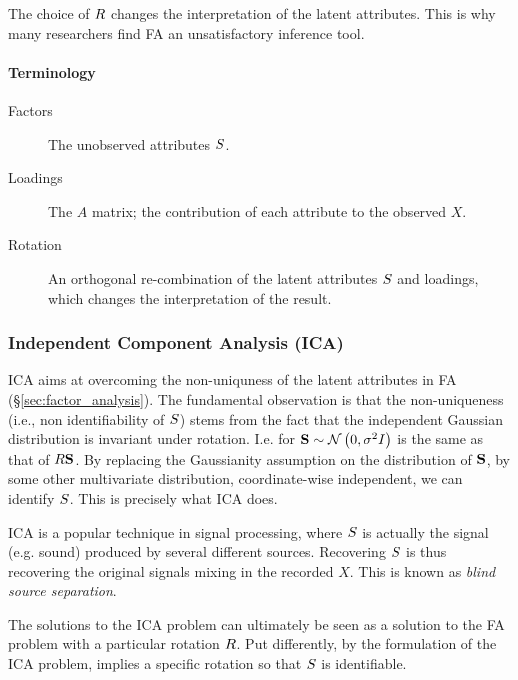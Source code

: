 The choice of $R$ changes the interpretation of the latent attributes. This is why many researchers find FA an unsatisfactory inference tool.



\paragraph{Terminology}
\begin{description}
\item[Factors] The unobserved attributes $S$.
\item[Loadings] The $A$ matrix; the contribution of each attribute to the observed $X$.
\item[Rotation] An orthogonal re-combination of the latent attributes $S$ and loadings, which changes the interpretation of the result.
\end{description}




\subsubsection{Independent Component Analysis (ICA)}
ICA aims at overcoming the non-uniquness of the latent attributes in FA (\S\ref{sec:factor_analysis}).
The fundamental observation is that the non-uniqueness (i.e., non identifiability of $S$) stems from the fact that the independent Gaussian distribution is invariant under rotation. I.e. for $\mathbf{S} \sim \mathcal{N}\left(0,\sigma^2 I\right)$ is the same as that of $R \mathbf{S}$. 
By replacing the Gaussianity assumption on the distribution of $\mathbf{S}$, by some other multivariate distribution, coordinate-wise independent, we can identify $S$. 
This is precisely what ICA does. 

\begin{remark}
ICA is a popular technique in signal processing, where $S$ is actually the signal (e.g. sound) produced by several different sources. Recovering $S$ is thus recovering the original signals mixing in the recorded $X$. This is known as \emph{blind source separation}.
\end{remark}

\begin{remark}
The solutions to the ICA problem can ultimately be seen as a solution to the FA problem with a particular rotation $R$.
Put differently, by the formulation of the ICA problem, implies a specific rotation so that $S$ is identifiable. 
\end{remark}

